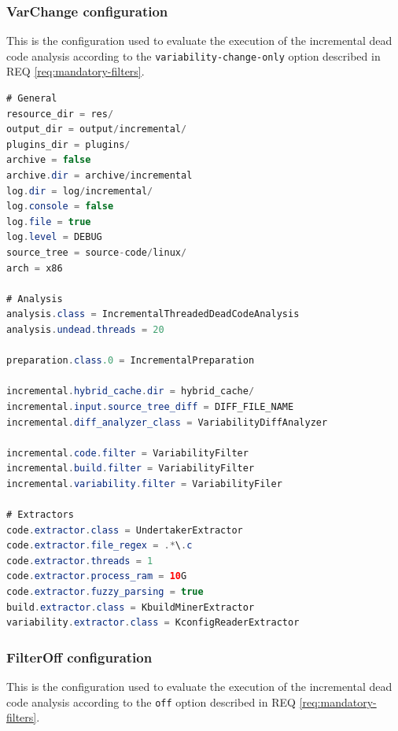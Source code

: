\documentclass[a4paper]{article}
\begin{document}
\subsubsection{VarChange configuration}

This is the configuration used to evaluate the execution of the incremental dead code analysis according to the \texttt{variability-change-only} option described in  REQ \ref{req:mandatory-filters}.

\begin{lstlisting}[language=java]
# General
resource_dir = res/
output_dir = output/incremental/
plugins_dir = plugins/
archive = false
archive.dir = archive/incremental
log.dir = log/incremental/
log.console = false
log.file = true
log.level = DEBUG
source_tree = source-code/linux/
arch = x86

# Analysis  
analysis.class = IncrementalThreadedDeadCodeAnalysis
analysis.undead.threads = 20

preparation.class.0 = IncrementalPreparation

incremental.hybrid_cache.dir = hybrid_cache/
incremental.input.source_tree_diff = DIFF_FILE_NAME
incremental.diff_analyzer_class = VariabilityDiffAnalyzer

incremental.code.filter = VariabilityFilter
incremental.build.filter = VariabilityFilter
incremental.variability.filter = VariabilityFiler

# Extractors  
code.extractor.class = UndertakerExtractor
code.extractor.file_regex = .*\.c
code.extractor.threads = 1
code.extractor.process_ram = 10G
code.extractor.fuzzy_parsing = true
build.extractor.class = KbuildMinerExtractor
variability.extractor.class = KconfigReaderExtractor
\end{lstlisting}

\clearpage

\subsubsection{FilterOff configuration}

This is the configuration used to evaluate the execution of the incremental dead code analysis according to the \texttt{off} option described in  REQ \ref{req:mandatory-filters}.
\end{document}
